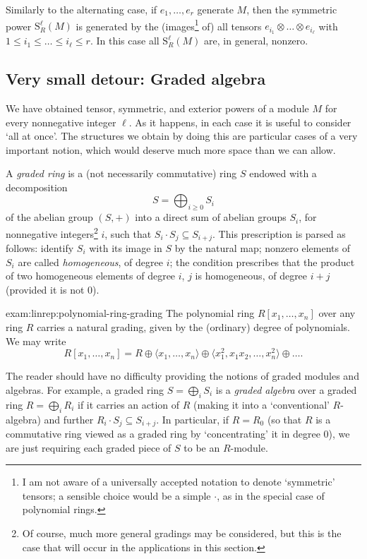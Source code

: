 Similarly to the alternating case, if $e_1, \dots, e_r$ generate $M$,
then the symmetric power $\mathrm{S}^\ell_R(M)$ is generated by the
(images\footnote{I am not aware of a universally accepted notation to
  denote `symmetric' tensors; a sensible choice would be a simple
  $\cdot$, as in the special case of polynomial rings.} of) all
tensors $e_{i_1} \otimes \dots \otimes e_{i_\ell}$ with
$1 \leq i_1 \leq \dots \leq i_\ell \leq r$. In this case all
$\mathrm{S}^\ell_R(M)$ are, in general, nonzero.

\subsection{Very small detour: Graded algebra}
\label{subsec:linrep:very-small-detour-graded-algebra}
We have obtained tensor, symmetric, and exterior powers of a module
$M$ for every nonneg\-ative integer $\ell$. As it happens, in each
case it is useful to consider `all at once'. The structures we obtain
by doing this are particular cases of a very important notion, which
would deserve much more space than we can allow.

A \emph{graded ring} is a (not necessarily commutative) ring $S$
endowed with a decomposition
\[
  S = \bigoplus_{i \geq 0} S_i
\]
of the abelian group $(S, +)$ into a direct sum of abelian groups
$S_i$, for nonnegative integers\footnote{Of course, much more general
  gradings may be considered, but this is the case that will occur in
  the applications in this section.} $i$, such that
$S_i \cdot S_j \subseteq S_{i+j}$. This prescription is parsed as
follows: identify $S_i$ with its image in $S$ by the natural map;
nonzero elements of $S_i$ are called \emph{homogeneous}, of degree
$i$; the condition prescribes that the product of two homogeneous
elements of degree $i$, $j$ is homogeneous, of degree $i + j$
(provided it is not $0$).
\begin{exam}{}{exam:linrep:polynomial-ring-grading}
  The polynomial ring $R[x_1, \dots, x_n]$ over any ring $R$ carries a
  natural grading, given by the (ordinary) degree of polynomials. We
  may write
  \[
    R[x_1, \dots, x_n] = R \oplus \langle x_1, \dots, x_n \rangle
    \oplus \langle x_1^2, x_1 x_2, \dots, x_n^2 \rangle \oplus \dots.
  \]
\end{exam}
The reader should have no difficulty providing the notions of graded
modules and algebras. For example, a graded ring $S = \bigoplus_i S_i$
is a \emph{graded algebra} over a graded ring $R = \bigoplus_i R_i$ if
it carries an action of $R$ (making it into a `conventional'
$R$-algebra) and further $R_i \cdot S_j \subseteq S_{i+j}$. In
particular, if $R = R_0$ (so that $R$ is a commutative ring viewed as
a graded ring by `concentrating' it in degree $0$), we are just
requiring each graded piece of $S$ to be an $R$-module.

